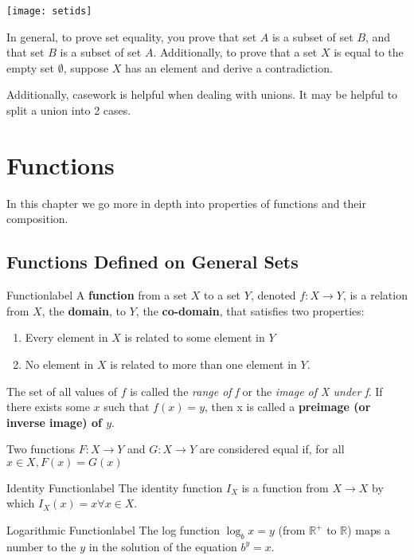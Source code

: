 \documentclass[a4paper]{report}
\begin{document}
\texttt{[image: setids]}

In general, to prove set equality, you prove that set $A$ is a subset of set $B$, and that
set $B$ is a subset of set $A$. Additionally, to prove that a set $X$ is equal to the empty set
$\emptyset$, suppose $X$ has an element and derive a contradiction.

Additionally, casework is helpful when dealing with unions. It may be helpful to split a union into
2 cases.

\chapter{Functions}

In this chapter we go more in depth into properties of functions and their composition.

\section{Functions Defined on General Sets}

\begin{definition}{Function}{label}
    A \textbf{function} from a set $X$ to a set $Y$, denoted $f: X \to Y$, is a relation from
    $X$, the \textbf{domain}, to $Y$, the \textbf{co-domain}, that satisfies two properties:
    \begin{enumerate}
        \item Every element in $X$ is related to some element in $Y$
        \item No element in $X$ is related to more than one element in $Y$.
    \end{enumerate}
    The set of all values of $f$ is called the \emph{range of f} or the \emph{image of X under f}.
    If there exists some $x$ such that $f(x)=y$, then x is called a \textbf{preimage 
    (or inverse image) of $y$}.

    Two functions $F: X \to Y$ and $G: X \to Y$ are considered equal if, for all $x \in X, F(x) = G(x)$
\end{definition}

\begin{definition}{Identity Function}{label}
    The identity function $I_X$ is a function from $X \to X$ by which $I_X(x) = x \forall x \in X$.
\end{definition}

\begin{definition}{Logarithmic Function}{label}
    The log function $\log_b{x}=y$ (from $\mathbb{R}^{+}$ to $\mathbb{R}$) maps a number to the $y$ in the solution of
    the equation $b^y=x$.
\end{definition}
\end{document}
